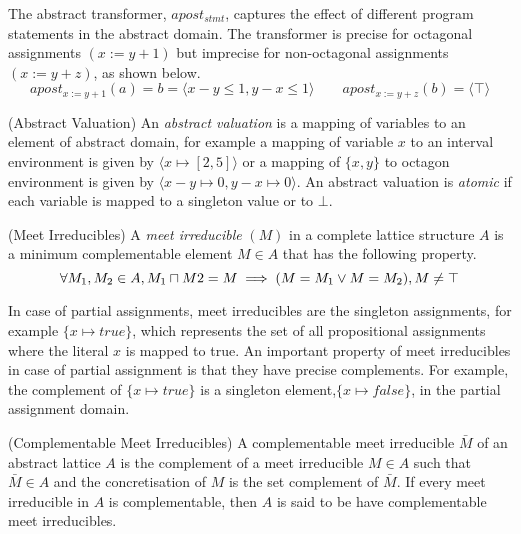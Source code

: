 The abstract transformer, $apost_{stmt}$, captures the effect of different program 
statements in the abstract domain. The transformer is precise for octagonal 
assignments $(x:=y+1)$ but imprecise for non-octagonal assignments $(x:=y+z)$, 
as shown below.
\[apost_{x:=y+1}(a) = b = \langle x-y \leq 1, y-x \leq 1 \rangle \qquad apost_{x:=y+z}(b) = \langle \top \rangle \]  

\begin{definition}{(Abstract Valuation)} An {\em abstract valuation} is a
mapping of variables to an element of abstract domain, for example 
a mapping of variable $x$ to an interval environment is given by 
$\langle x \mapsto [2,5] \rangle$ or a mapping of $\{x,y\}$ to octagon 
environment is given by $\langle x-y \mapsto 0, y-x \mapsto 0 \rangle$.  
An abstract valuation is {\em atomic} if each variable is mapped to a singleton 
value or to $\bot$.  
\end{definition}

\begin{definition}{(Meet Irreducibles)} A {\em meet irreducible} $(M)$ 
in a complete lattice structure $A$ is a minimum complementable element 
$M \in A$ that has the following property.
\[\forall M_1, M_2 \in A, M_1 \sqcap M2 = M \implies (M = M_1 \lor M = M_2), M \neq \top \]  
\end{definition}

In case of partial assignments, meet irreducibles are the singleton
assignments, for example $\{x \mapsto true \}$, which represents the set 
of all propositional assignments where the literal $x$ is mapped to true.  
An important property of meet irreducibles in case of partial assignment is that 
they have precise complements.  For example, the complement of $\{x \mapsto true \}$
is a singleton element,$\{x \mapsto false \}$, in the partial assignment domain. 

\begin{definition}{(Complementable Meet Irreducibles)} A complementable meet
irreducible $\bar{M}$ of an abstract lattice $A$ is the complement of a meet 
irreducible $M \in A$ such that $\bar{M} \in A$ and the concretisation of $M$ 
is the set complement of $\bar{M}$.  If every meet irreducible in $A$ is
complementable, then $A$ is said to be have complementable meet irreducibles.  
\end{definition}



